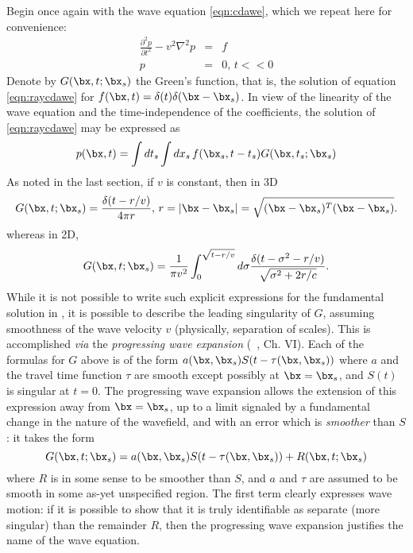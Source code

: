 Begin once again with the wave equation \ref{eqn:cdawe}, which we
repeat here for convenience:
\begin{eqnarray}
\label{eqn:raycdawe}
\frac{\partial^2 p}{\partial t^2} -v^2 \nabla^2 p& = & f\\
p &= & 0, \,t<<0 \nonumber 
\end{eqnarray} 
Denote by $G(\bx,t;\bx_s)$ the Green's function, that is, the solution of equation \ref{eqn:raycdawe} for 
$f(\bx,t) = \delta(t)\delta(\bx-\bx_s)$. In view of the linearity of the wave equation and the time-independence of the coefficients, the solution of \ref{eqn:raycdawe} may be expressed as 
\begin{equation}
\label{eqn:green}
p(\bx,t ) = \int dt_s \int dx_s \,f(\bx_s,t-t_s)G(\bx,t_s;\bx_s)
\end{equation}
As noted in the last section, if $v$ is constant, then in 3D 
\begin{equation}
\label{eqn:green3d}
G(\bx,t;\bx_s) = \frac{\delta(t-r/v)}{4\pi r}, \,r=|\bx-\bx_s| = \sqrt{(\bx-\bx_s)^T(\bx-\bx_s)}.
\end{equation}
whereas in 2D,
\begin{equation}\label{eqn:green2d}
G(\bx,t;\bx_s)=\frac{1}{\pi v^2} \int_0^{\sqrt{t-r/v}}d\sigma \frac{\delta(t-\sigma^2-r/v)}{\sqrt{\sigma^2 + 2r/c}}. 
\end{equation}
While it is not possible to write such explicit expressions for the
fundamental solution in , it is possible
to describe the leading singularity of $G$, assuming smoothness of the
wave velocity $v$ (physically, separation of scales).  This is accomplished {\em via} the
{\em progressing wave expansion} (~\cite{CourHil:62}, Ch. VI).  Each
of the formulas for $G$ above is of the form $a(\bx,\bx_s)S(t-\tau(\bx,\bx_s))$
where $a$ and the travel time function $\tau$ are smooth except possibly at
$\bx=\bx_s$, and $S(t)$ is singular at $t=0$.  The progressing wave expansion
allows the extension of this expression away from $\bx=\bx_s$, up to a limit
signaled by a fundamental change in the nature of the wavefield, and with an
error which is {\em smoother} than $S$: it takes the form
\begin{equation}
\label{eqn:progwave}
G(\bx,t;\bx_s) = a(\bx,\bx_s)S(t-\tau(\bx,\bx_s)) + R(\bx,t;\bx_s)
\end{equation}
where $R$ is in some sense to be smoother than $S$, and $a$ and $\tau$ are
assumed to be smooth in some as-yet unspecified region. The first term
clearly expresses wave motion: if it is possible to show that it is
truly identifiable as separate (more singular) than the remainder $R$,
then the progressing wave expansion justifies the name of the wave equation.

